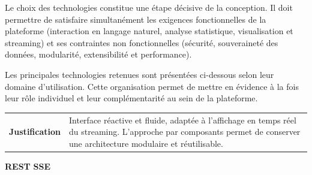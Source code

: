 Le choix des technologies constitue une étape décisive de la conception.
Il doit permettre de satisfaire simultanément les exigences fonctionnelles
de la plateforme (interaction en langage naturel, analyse statistique,
visualisation et streaming) et ses contraintes non fonctionnelles
(sécurité, souveraineté des données, modularité, extensibilité et
performance).

Les principales technologies retenues sont présentées ci-dessous selon
leur domaine d'utilisation. Cette organisation permet de mettre en
évidence à la fois leur rôle individuel et leur complémentarité au sein
de la plateforme.


\vspace{0.4cm}


\vspace{0.15cm}

\noindent
{}
\hspace{0.8cm}

\vspace{0.15cm}

\noindent
\begin{tabularx}{\textwidth}{@{}p{}X@{}}
\textcolor{MidGray}{\textbf{Justification}} &
Interface réactive et fluide, adaptée à l'affichage en temps réel
du streaming. L'approche par composants permet de conserver une
architecture modulaire et réutilisable.
\end{tabularx}

\techseparator



\vspace{0.15cm}

\noindent
{}
\hspace{0.8cm}
{\bfseries\color{DarkSlate}REST}
\hspace{0.8cm}
{\bfseries\color{DarkSlate}SSE}

\vspace{0.15cm}

